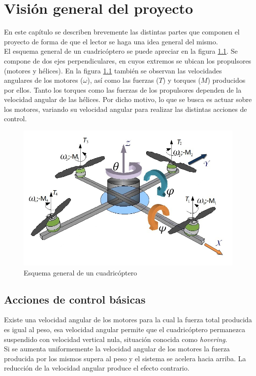 \documentclass[main]{subfiles}
\begin{document}
\chapter{Visi\'on general del proyecto}
\label{chap:general}
En este cap\'itulo se describen brevemente las distintas partes que componen el proyecto de forma de que el lector se haga una idea general del mismo.\\

El esquema general de un cuadric\'optero se puede apreciar en la figura \ref{fig:cuad}. Se compone de dos ejes perpendiculares, en cuyos extremos se ubican los propulsores (motores y h\'elices). En la figura \ref{fig:cuad} tambi\'en se observan las velocidades angulares de los motores ($\omega$), as\'i como las fuerzas ($T$) y torques ($M$) producidos por ellos. Tanto los torques como las fuerzas de los propulsores dependen de la velocidad angular de las h\'elices. Por dicho motivo, lo que se busca es actuar sobre los motores, variando su velocidad angular para realizar las distintas acciones de control.

\begin{figure}
\centering
\includegraphics[scale=0.4]{./pics_general/quad_hov.jpg}
\caption{Esquema general de un cuadric\'optero}
\label{fig:cuad}
\end{figure}
\section{Acciones de control b\'asicas}
Existe una velocidad angular de los motores para la cual la fuerza total producida es igual al peso, esa velocidad angular permite que el cuadric\'optero permanezca suspendido con velocidad vertical nula, situaci\'on conocida como \emph{hovering}.\\ Si se aumenta uniformemente la velocidad angular de los motores la fuerza producida por los mismos supera al peso y el sistema se acelera hacia arriba. La reducción de la velocidad angular produce el efecto contrario.\\
\end{document}
